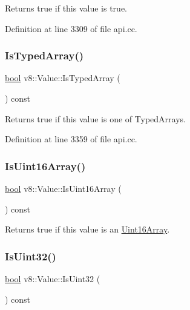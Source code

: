 Returns true if this value is true. 

Definition at line 3309 of file api.\+cc.

\mbox{\label{classv8_1_1Value_a01183cf30ba5e6383cdca82daee630d8}} 
\subsubsection{\texorpdfstring{Is\+Typed\+Array()}{IsTypedArray()}}
{\footnotesize\ttfamily \mbox{\hyperlink{classbool}{bool}} v8\+::\+Value\+::\+Is\+Typed\+Array (\begin{DoxyParamCaption}{ }\end{DoxyParamCaption}) const}

Returns true if this value is one of Typed\+Arrays. 

Definition at line 3359 of file api.\+cc.

\mbox{\label{classv8_1_1Value_af3e8da420ddc0f92aac5dbfe61ac9699}} 
\subsubsection{\texorpdfstring{Is\+Uint16\+Array()}{IsUint16Array()}}
{\footnotesize\ttfamily \mbox{\hyperlink{classbool}{bool}} v8\+::\+Value\+::\+Is\+Uint16\+Array (\begin{DoxyParamCaption}{ }\end{DoxyParamCaption}) const}

Returns true if this value is an \mbox{\hyperlink{classv8_1_1Uint16Array}{Uint16\+Array}}. \mbox{\label{classv8_1_1Value_ae30d50fb96b03239bc90ceb07b6e46fc}} 
\subsubsection{\texorpdfstring{Is\+Uint32()}{IsUint32()}}
{\footnotesize\ttfamily \mbox{\hyperlink{classbool}{bool}} v8\+::\+Value\+::\+Is\+Uint32 (\begin{DoxyParamCaption}{ }\end{DoxyParamCaption}) const}

